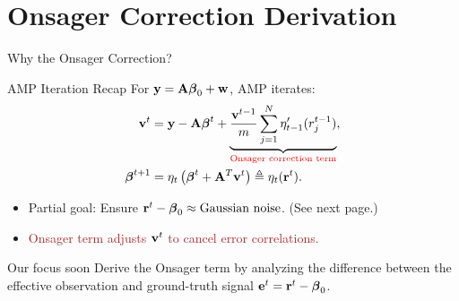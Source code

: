 \documentclass[aspectratio=43, 10pt]{beamer}
\begin{document}
\section{Onsager Correction Derivation}
\begin{frame}{Why the Onsager Correction?}
    \vspace{-5mm}
    \begin{block}{AMP Iteration Recap}
        For \(\bold{y} = \bold{A} \boldsymbol{\beta}_0 + \bold{w}\), AMP iterates:
        \begin{align*}
            \bold{v}^{t} &= \bold{y} - \bold{A} \boldsymbol{\beta}^t + \underbrace{\frac{\bold{v}^{t-1}}{m} \sum_{j=1}^N \eta_{t-1}'(r_j^{t-1})}_{\textcolor{red}{\text{Onsager correction term}}}, \\
            \boldsymbol{\beta}^{t+1} &= \eta_t \left( \boldsymbol{\beta}^t + \bold{A}^T \bold{v}^t \right) \triangleq \eta_t(\bold{r}^t).
        \end{align*}
    \end{block}

    \pause
    \begin{itemize}
        \item Partial goal: Ensure \(\bold{r}^t - \boldsymbol{\beta}_0 \approx  \text{Gaussian noise}\). (See next page.)
        \item \textcolor{brown}{Onsager term adjusts \(\bold{v}^t\) to cancel error correlations.}
    \end{itemize}
    
    \begin{block}{Our focus soon}
        Derive the Onsager term by analyzing the difference between the effective observation and ground-truth signal \(\bold{e}^t = \bold{r}^t - \boldsymbol{\beta}_0\).
    \end{block}
\end{frame}
\end{document}
